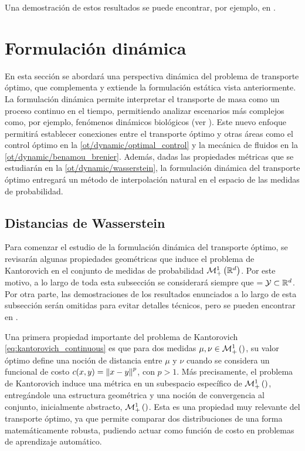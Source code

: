 Una demostración de estos resultados se puede encontrar, por ejemplo, en \cite{bunne2023optimal}.

\section{Formulación dinámica}
\label{ot/dynamic}

En esta sección se abordará una perspectiva dinámica del problema de transporte óptimo, que complementa y extiende la formulación estática vista anteriormente. La formulación dinámica permite interpretar el transporte de masa como un proceso continuo en el tiempo, permitiendo analizar escenarios más complejos como, por ejemplo, fenómenos dinámicos biológicos (ver \cite{Bunne2023}). Este nuevo enfoque permitirá establecer conexiones entre el transporte óptimo y otras áreas como el control óptimo en la \autoref{ot/dynamic/optimal_control} y la mecánica de fluidos en la \autoref{ot/dynamic/benamou_brenier}. Además, dadas las propiedades métricas que se estudiarán en la \autoref{ot/dynamic/wasserstein}, la formulación dinámica del transporte óptimo entregará un método de interpolación natural en el espacio de las medidas de probabilidad.

\subsection{Distancias de Wasserstein}
\label{ot/dynamic/wasserstein}

Para comenzar el estudio de la formulación dinámica del transporte óptimo, se revisarán algunas propiedades geométricas que induce el problema de Kantorovich en el conjunto de medidas de probabilidad $\mathcal{M}_+^1\left(\mathbb{R}^d\right)$. Por este motivo, a lo largo de toda esta subsección se considerará siempre que $=\mathcal{Y}\subset\mathbb{R}^d$. Por otra parte, las demostraciones de los resultados enunciados a lo largo de esta subsección serán omitidas para evitar detalles técnicos, pero se pueden encontrar en \cite{villani2003topics}.

Una primera propiedad importante del problema de Kantorovich \eqref{eq:kantorovich_continuous} es que para dos medidas $\mu,\nu\in\mathcal{M}_+^1\left(\right)$, su valor óptimo define una noción de distancia entre $\mu$ y $\nu$ cuando se considera un funcional de costo $c(x,y)=\left\lVert x-y \right\rVert^p$, con $p>1$. Más precisamente, el problema de Kantorovich induce una métrica en un subespacio específico de $\mathcal{M}_+^1\left(\right)$, entregándole una estructura geométrica y una noción de convergencia al conjunto, inicialmente abstracto, $\mathcal{M}_+^1\left(\right)$. Esta es una propiedad muy relevante del transporte óptimo, ya que permite comparar dos distribuciones de una forma matemáticamente robusta, pudiendo actuar como función de costo en problemas de aprendizaje automático.

